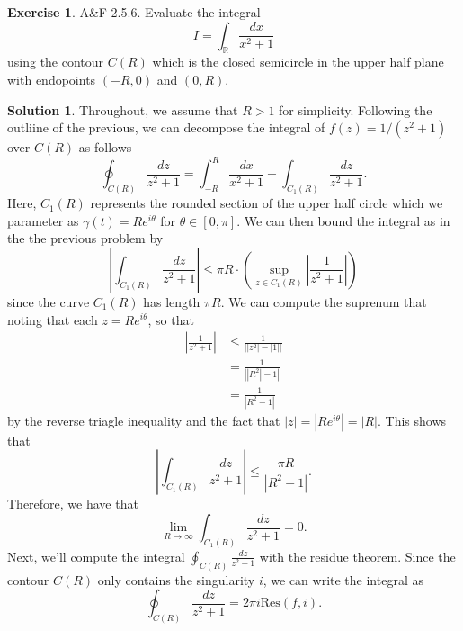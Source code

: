 \documentclass[12pt]{article}
\newcommand{\bbR}{\mathbb{R}}
\newcommand{\abs}[1]{ \left| #1 \right| }
\newcommand{\Res}{\text{Res}}
\theoremstyle{definition}
\newtheorem{exer}{Exercise}
\newtheorem{sol}{Solution}
\theoremstyle{remark}
\begin{document}
\newpage

\begin{exer}
    A\&F 2.5.6. Evaluate the integral
    \begin{equation}
        I = \int_\bbR \frac{dx}{x^2+1}
    \end{equation}
    using the contour $C(R)$ which is the closed semicircle in the upper half plane with endopoints $(-R, 0)$ and $(0,R)$.
\end{exer}
\begin{sol}
Throughout, we assume that $R>1$ for simplicity. Following the outliine of the previous, we can decompose the integral of $f(z)=1/(z^2+1)$ over $C(R)$ as follows
\begin{equation}
    \oint_{C(R)} \frac{dz}{z^2 + 1} = \int_{-R}^{R} \frac{dx}{x^2+1} + \int_{C_1(R)}  \frac{dz}{z^2 + 1}.
\end{equation}
Here, $C_1(R)$ represents the rounded section of the upper half circle which we parameter as $\gamma(t) = Re^{i\theta}$ for $\theta\in[0, \pi]$. We can then bound the integral as in the the previous problem by
\begin{equation}
    \abs{\int_{C_1(R)} \frac{dz}{z^2 + 1}} \leq \pi R \cdot \left( \sup_{z\in C_1(R)} \abs{\frac{1}{z^2 + 1}}\right)
\end{equation}
since the curve $C_1(R)$ has length $\pi R$. We can compute the suprenum that noting that each $z=Re^{i\theta}$, so that
\begin{align}
    \abs{ \frac{1}{z^2 + 1}} &\leq \frac{1}{\abs{\abs{z^2}-\abs{1}}}\\
    &= \frac{1}{\abs{\abs{R^2} - 1}}\\
    &= \frac{1}{\abs{R^2 -1}}
\end{align}
by the reverse triagle inequality and the fact that $\abs{z} = \abs{Re^{i\theta}} = \abs{R}$. This shows that
\begin{equation}
       \abs{\int_{C_1(R)} \frac{dz}{z^2 + 1}} \leq \frac{\pi R}{\abs{R^2 -1}}.
\end{equation}
Therefore, we have that 
\begin{equation}
    \lim\limits_{R\to\infty} \int_{C_1(R)} \frac{dz}{z^2 + 1} = 0.
\end{equation}
Next, we'll compute the integral $ \oint_{C(R)} \frac{dz}{z^2 + 1}$ with the residue theorem. Since the contour $C(R)$ only contains the singularity $i$, we can write the integral as 
\begin{equation}
    \oint_{C(R)} \frac{dz}{z^2 + 1} = 2\pi i \Res(f, i).
\end{equation}


\end{sol}
\end{document}
